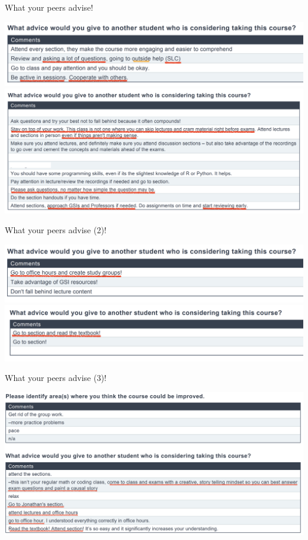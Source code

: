 \documentclass[11pt]{beamer}
\begin{document}
\begin{frame}{What your peers advise!}

\includegraphics[width=\textwidth]{figures/Feedback/advice1.png}
\includegraphics[width=\textwidth]{figures/Feedback/advice2.png}

\end{frame}


\begin{frame}{What your peers advise (2)!}

\includegraphics[width=\textwidth]{figures/Feedback/advice3.png}
\includegraphics[width=\textwidth]{figures/Feedback/advice4.png}

\end{frame}


\begin{frame}{What your peers advise (3)!}

\includegraphics[width=\textwidth]{figures/Feedback/feedback_f2023_3.png}

\end{frame}
\end{document}
